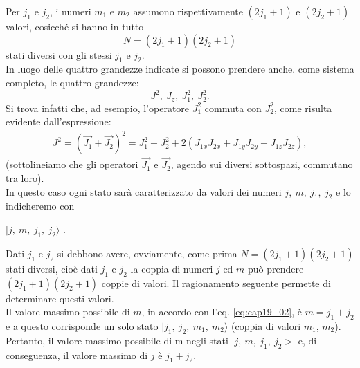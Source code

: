 Per $j_1$ e $j_2$, i numeri $m_1$ e $m_2$ assumono rispettivamente $(2 j_1 + 1)$ e $(2 j_2 + 1)$ 
valori, cosicché si hanno in tutto
\begin{equation} \label{eq:cap19_03}
N= (2j_1 + 1) (2j_2 + 1) 
\end{equation}
stati diversi con gli stessi $j_1$ e $j_2$. \\
In luogo delle quattro grandezze indicate si possono prendere anche. come sistema completo, le quattro grandezze:
\begin{equation}
J^2 ,~ J_z ,~ J_1^2 ,~ J_2^2 . 
\end{equation}
Si trova infatti che, ad esempio, l'operatore $J_1^2$  commuta con $J_2^2$, come risulta evidente dall'espressione:
\begin{align}
J^2 = (\vec{J_1} + \vec{J_2})^2 = J_1^2 + J_2^2 + 2 (J_{1x} J_{2x} + J_{1y} J_{2y} + J_{1z} J_{2z}),
\end{align}
(sottolineiamo che gli operatori $\vec{J_1}$ e $\vec{J_2}$, agendo sui diversi sottospazi, commutano tra loro).\\
 In questo caso ogni stato sarà caratterizzato da valori dei numeri $j, ~  m, ~ j_1,~  j_2$ e lo indicheremo con
\begin{center}
$| j ,~ m,~j_1, ~ j_2 \rangle $ .
\end{center}
Dati $j_1$ e $j_2$ si debbono avere, ovviamente, come prima $N = (2j_1+1)(2j_2+1)$ stati diversi, cioè dati $j_1$ e $j_2$ la coppia di numeri $j$ ed $m$ può prendere $(2j_1+1)(2j_2+1)$ coppie di valori. Il ragionamento seguente permette di determinare questi valori.\\
Il valore massimo possibile di $m$, in accordo con l'eq. \eqref{eq:cap19_02}, è $m = j_1 + j_2$ e a questo corrisponde un solo stato $| j_1 ,~ j_2,~m_1, ~ m_2 \rangle $ (coppia di valori $m_1$, $m_2$). Pertanto, il valore massimo possibile di m negli stati $\mid j ,~ m,~j_1, ~ j_2 > $  e, di conseguenza, il valore massimo di $j$ è $j_1 + j_2$. 

